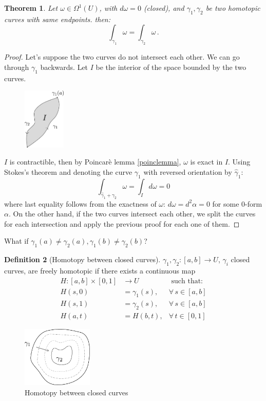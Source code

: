 \documentclass[a4paper,11pt,titlepage, article, oneside]{memoir}
\numberwithin{equation}{section}
\newtheorem{theorem}{Theorem}[section]
\theoremstyle{definition}
\newtheorem{definition}[theorem]{Definition}
\theoremstyle{remark}
\begin{document}
\begin{theorem}
  Let $\omega \in \Omega^1(U)$, with $d \omega = 0$ (closed), and $\gamma_1, \gamma_2$ be two homotopic curves with same endpoints. then:
  \begin{equation}
    \int_{\gamma_1} \omega = \int_{\gamma_2} \omega \, .
  \end{equation}
\end{theorem}
\begin{proof}
Let's suppose the two curves do not intersect each other.
We can go through $\gamma_1$ backwards. Let $I$ be the interior of the space bounded by the two curves.
\begin{figure}[H] \label{Fig:hom4}
     \centering
     \includegraphics[width=0.18\textwidth]{Images/homotopy4.pdf}
\end{figure}
$I$ is contractible, then by Poincarè lemma \ref{poinclemma}, $\omega$ is exact in $I$. Using Stokes's theorem and denoting the curve $\gamma_1$ with reversed orientation by $\hat \gamma_1$:
$$\int_{\hat \gamma_1 + \gamma_2} \omega = \int_I d \omega = 0$$
where last equality follows from the exactness of $\omega$: $d\omega = d^2 \alpha=0$ for some 0-form $\alpha$.
On the other hand, if the two curves intersect each other, we split the curves for each intersection and apply the previous proof for each one of them.
\end{proof}

What if $\gamma_1(a) \not = \gamma_2(a), \gamma_1(b) \not = \gamma_2(b)$?
\begin{definition}[Homotopy between closed curves]
$\gamma_1, \gamma_2 \colon [a, b] \rightarrow U$, $\gamma_i$ closed curves, are freely homotopic if there exists a continuous map
\begin{align*}
  H \colon [a, b] \times [0, 1] &\rightarrow U &\text{ such that:} \\
  H(s, 0) &= \gamma_1(s), &\forall\, s \in [a, b] \\
  H(s, 1) &= \gamma_2(s), &\forall\, s \in [a, b] \\
  H(a, t) &= H(b, t), &\forall\, t \in [0, 1]
\end{align*}
 \begin{figure}[H] \label{Fig:hom3}
     \centering
     \includegraphics[width=0.3\textwidth]{Images/homotopy3.pdf}
     \caption{Homotopy between closed curves}
\end{figure}
\end{definition}
\end{document}
